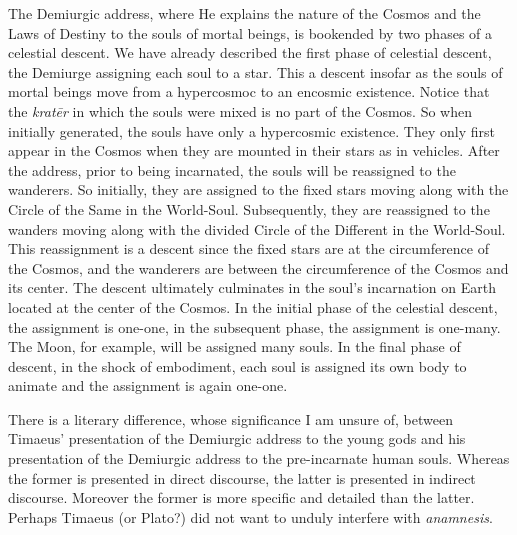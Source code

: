 The Demiurgic address, where He explains the nature of the Cosmos and the Laws of Destiny to the souls of mortal beings, is bookended by two phases of a celestial descent. We have already described the first phase of celestial descent, the Demiurge assigning each soul to a star. This a descent insofar as the souls of mortal beings move from a hypercosmoc to an encosmic existence. Notice that the \emph{kratēr} in which the souls were mixed is no part of the Cosmos. So when initially generated, the souls have only a hypercosmic existence. They only first appear in the Cosmos when they are mounted in their stars as in vehicles. After the address, prior to being incarnated, the souls will be reassigned to the wanderers. So initially, they are assigned to the fixed stars moving along with the Circle of the Same in the World-Soul. Subsequently, they are reassigned to the wanders moving along with the divided Circle of the Different in the World-Soul. This reassignment is a descent since the fixed stars are at the circumference of the Cosmos, and the wanderers are between the circumference of the Cosmos and its center. The descent ultimately culminates in the soul's incarnation on Earth located at the center of the Cosmos. In the initial phase of the celestial descent, the assignment is one-one, in the subsequent phase, the assignment is one-many. The Moon, for example, will be assigned many souls. In the final phase of descent, in the shock of embodiment, each soul is assigned its own body to animate and the assignment is again one-one.

There is a literary difference, whose significance I am unsure of, between Timaeus' presentation of the Demiurgic address to the young gods and his presentation of the Demiurgic address to the pre-incarnate human souls. Whereas the former is presented in direct discourse, the latter is presented in indirect discourse. Moreover the former is more specific and detailed than the latter. Perhaps Timaeus (or Plato?) did not want to unduly interfere with \emph{anamnesis}.

